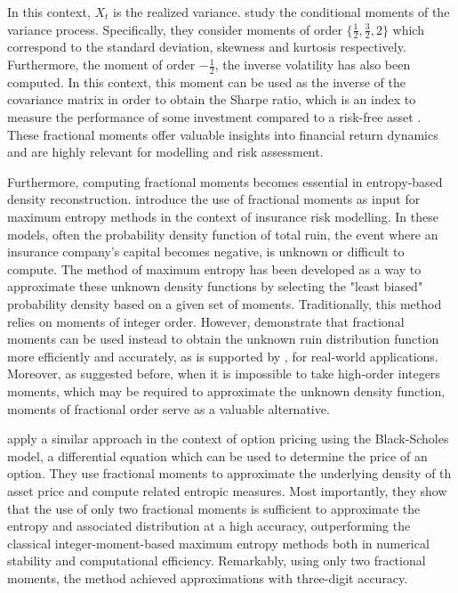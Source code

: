 In this context, \(X_t\) is the realized variance. \citet{hansen2024} study the conditional moments of the variance process. Specifically, they consider moments of order \(\{\frac{1}{2}, \frac{3}{2}, 2\}\) which correspond to the standard deviation, skewness and kurtosis respectively. Furthermore, the moment of order \(-\frac{1}{2}\), the inverse volatility has also been computed. In this context, this moment can be used as the inverse of the covariance matrix in order to obtain the Sharpe ratio, which is an index to measure the performance of some investment compared to a risk-free asset \citep{sharpe1994}. These fractional moments offer valuable insights into financial return dynamics and are highly relevant for modelling and risk assessment. 

Furthermore, computing fractional moments becomes essential in entropy-based density reconstruction. \citet{gyzl2013} introduce the use of fractional moments as input for maximum entropy methods in the context of insurance risk modelling. In these models, often the probability density function of total ruin, the event where an insurance company's capital becomes negative, is unknown or difficult to compute. The method of maximum entropy has been developed as a way to approximate these unknown density functions by selecting the "least biased" probability density based on a given set of moments. Traditionally, this method relies on moments of integer order. However, \citet{gyzl2013} demonstrate that fractional moments can be used instead to obtain the unknown ruin distribution function more efficiently and accurately, as is supported by \citet{lin1992}, for real-world applications. Moreover, as suggested before, when it is impossible to take high-order integers moments, which may be required to approximate the unknown density function, moments of fractional order serve as a valuable alternative. 

\citet{DAmico2002} apply a similar approach in the context of option pricing using the Black-Scholes model, a differential equation which can be used to determine the price of an option. They use fractional moments to approximate the underlying density of th asset price and compute related entropic measures. Most importantly, they show that the use of only two fractional moments is sufficient to approximate the entropy and associated distribution at a high accuracy, outperforming the classical integer-moment-based maximum entropy methods both in numerical stability and computational efficiency. Remarkably, using only two fractional moments, the method achieved approximations with three-digit accuracy.

